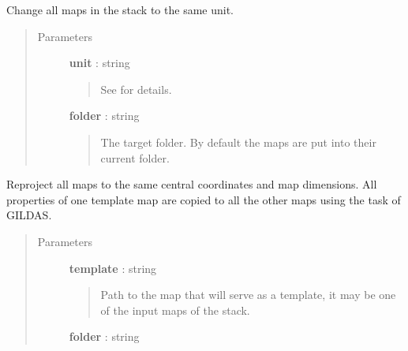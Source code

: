 \documentclass[a4paper,10pt,english]{sphinxmanual}
\begin{document}
\begin{fulllineitems}
\begin{fulllineitems}
\end{fulllineitems}


\begin{fulllineitems}
\label{maps:astrolyze.maps.stack.Stack.unify_units}
Change all maps in the stack to the same unit.
\begin{quote}\begin{description}
\item[{Parameters }] \leavevmode
\textbf{unit} : string
\begin{quote}

See 
for details.
\end{quote}

\textbf{folder} : string
\begin{quote}

The target folder. By default the maps
are put into their current folder.
\end{quote}

\end{description}\end{quote}

\end{fulllineitems}


\begin{fulllineitems}
\label{maps:astrolyze.maps.stack.Stack.unify_dimensions}
Reproject all maps to the same central coordinates and map
dimensions.  All properties of one template map are copied to all the
other maps using the  task of GILDAS.
\begin{quote}\begin{description}
\item[{Parameters }] \leavevmode
\textbf{template} : string
\begin{quote}

Path to the map that will serve as a template, it may be one of
the input maps of the stack.
\end{quote}

\textbf{folder} : string
\begin{quote}


\end{quote}
\end{description}
\end{quote}
\end{fulllineitems}
\end{fulllineitems}
\end{document}
